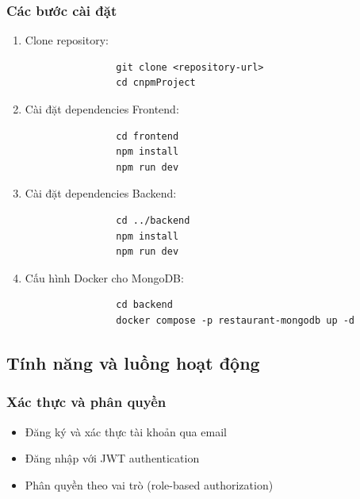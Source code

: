 \documentclass[a4paper]{article}
\begin{document}
        \subsubsection{Các bước cài đặt}
        \begin{enumerate}
            \item Clone repository:
            \begin{verbatim}
                git clone <repository-url>
                cd cnpmProject
            \end{verbatim}
            
            \item Cài đặt dependencies Frontend:
            \begin{verbatim}
                cd frontend
                npm install
                npm run dev
            \end{verbatim}
            
            \item Cài đặt dependencies Backend:
            \begin{verbatim}
                cd ../backend
                npm install
                npm run dev
            \end{verbatim}
            
            \item Cấu hình Docker cho MongoDB:
            \begin{verbatim}
                cd backend
                docker compose -p restaurant-mongodb up -d
            \end{verbatim}
        \end{enumerate}

    \subsection{Tính năng và luồng hoạt động}
        \subsubsection{Xác thực và phân quyền}
        \begin{itemize}
            \item Đăng ký và xác thực tài khoản qua email
            \item Đăng nhập với JWT authentication
            \item Phân quyền theo vai trò (role-based authorization)
        \end{itemize}
        
\end{document}
